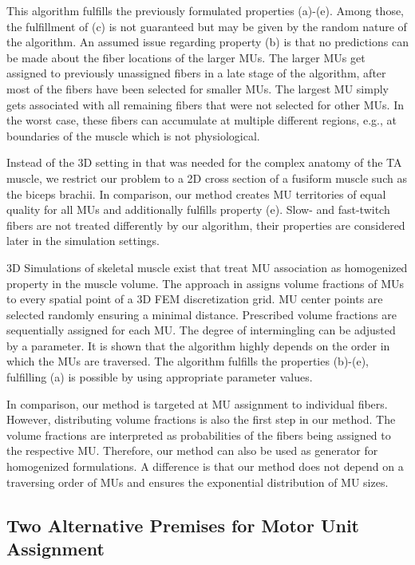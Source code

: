 This algorithm fulfills the previously formulated properties (a)-(e). Among those, the fulfillment of (c) is not guaranteed but may be given by the random nature of the algorithm. An assumed issue regarding property (b) is that no predictions can be made about the fiber locations of the larger MUs. The larger MUs get assigned to previously unassigned fibers in a late stage of the algorithm, after most of the fibers have been selected for smaller MUs. The largest MU simply gets associated with all remaining fibers that were not selected for other MUs. In the worst case, these fibers can accumulate at multiple different regions, e.g., at boundaries of the muscle which is not physiological.

Instead of the 3D setting in \cite{Roehrle2012} that was needed for the complex anatomy of the TA muscle, we restrict our problem to a 2D cross section of a fusiform muscle such as the biceps brachii. In comparison, our method creates MU territories of equal quality for all MUs and additionally fulfills property (e). Slow- and fast-twitch fibers are not treated differently by our algorithm, their properties are considered later in the simulation settings.

3D Simulations of skeletal muscle exist that treat MU association as homogenized property in the muscle volume. The approach in \cite{harry2018} assigns volume fractions of MUs to every spatial point of a 3D FEM discretization grid. MU center points are selected randomly ensuring a minimal distance. Prescribed volume fractions are sequentially assigned for each MU. The degree of intermingling can be adjusted by a parameter. It is shown that the algorithm highly depends on the order in which the MUs are traversed. The algorithm fulfills the properties (b)-(e), fulfilling (a) is possible by using appropriate parameter values.

In comparison, our method is targeted at MU assignment to individual fibers. However, distributing volume fractions is also the first step in our method. The volume fractions are interpreted as probabilities of the fibers being assigned to the respective MU. Therefore, our method can also be used as generator for homogenized formulations. A difference is that our method does not depend on a traversing order of MUs and ensures the exponential distribution of MU sizes.

\subsection{Two Alternative Premises for Motor Unit Assignment}

